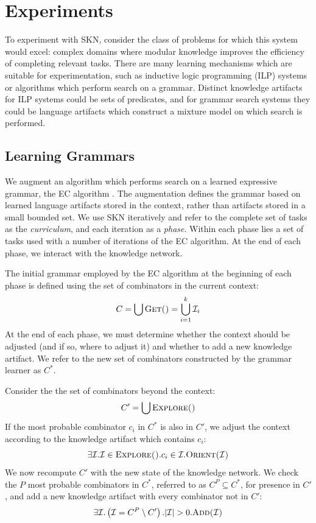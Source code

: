 \documentclass[11pt,letterpaper]{article}
\begin{document}
\section{Experiments}

To experiment with SKN, consider the class of problems for which this system
would excel: complex domains where modular knowledge improves the efficiency
of completing relevant tasks. There are many learning mechanisms which are
suitable for experimentation, such as inductive logic programming (ILP)
systems or algorithms which perform search on a grammar. Distinct knowledge
artifacts for ILP systems could be sets of predicates, and for grammar
search systems they could be language artifacts which construct a mixture
model on which search is performed.

\subsection{Learning Grammars}
We augment an algorithm which performs search on a learned expressive
grammar, the EC algorithm \cite{dechter13}. The augmentation defines the
grammar based on learned language artifacts stored in the context, rather
than artifacts stored in a small bounded set. We use SKN iteratively and
refer to the complete set of tasks as the {\em curriculum}, and each
iteration as a {\em phase}. Within each phase lies a set of tasks used with
a number of iterations of the EC algorithm. At the end of each phase, we
interact with the knowledge network.

The initial grammar employed by the EC algorithm at the beginning of each
phase is defined using the set of combinators in the current context:
\[C = \bigcup\text{\sc Get()} = \bigcup_{i=1}^k\mathcal{I}_i\]
At the end of each phase, we must determine whether the context should be
adjusted (and if so, where to adjust it) and whether to add a new knowledge
artifact. We refer to the new set of combinators constructed by the grammar
learner as $C^*$.

Consider the the set of combinators beyond the context:
\[C' = \bigcup\text{\sc Explore()}\]
If the most probable combinator $c_i$ in $C^*$ is also in $C'$, we adjust
the context according to the knowledge artifact which contains $c_i$:
\[\exists\mathcal{I}.\mathcal{I}\in\text{\sc Explore()}.c_i\in\mathcal{I}.\text{\sc Orient($\mathcal{I}$)}\]
We now recompute $C'$ with the new state of the knowledge network. We check
the $P$ most probable combinators in $C^*$, referred to as $C^P\subseteq
C^*$, for presence in $C'$, and add a new knowledge artifact with every
combinator not in $C'$:
\[\exists\mathcal{I}.\left(\mathcal{I}=C^P\setminus C'\right).
  |\mathcal{I}|>0.\text{\sc Add($\mathcal{I}$)}\]
\end{document}
